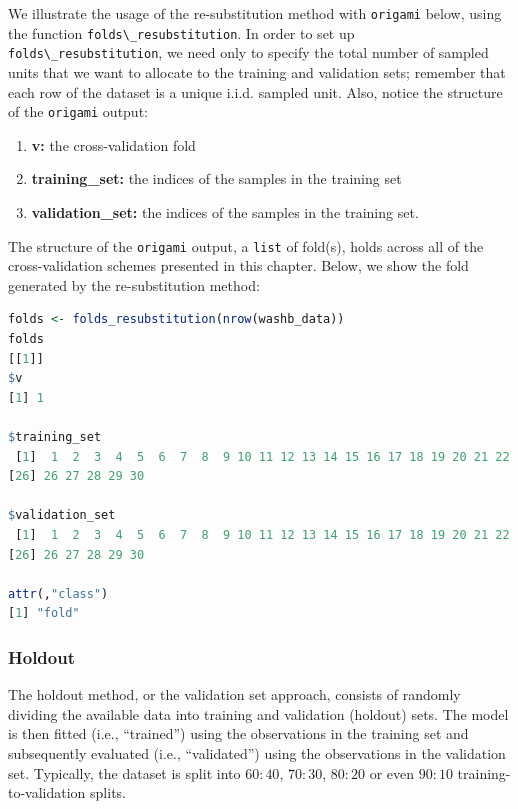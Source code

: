 \documentclass[
  12pt, krantz2,
]{krantz}
\newcommand{\passthrough}[1]{#1}
\providecommand{\tightlist}{%
  \setlength{\itemsep}{0pt}\setlength{\parskip}{0pt}}
\newcommand{\1}{\mathbbm{1}}
\theoremstyle{definition}
\theoremstyle{definition}
\theoremstyle{definition}
\theoremstyle{definition}
\theoremstyle{remark}
\begin{document}
We illustrate the usage of the re-substitution method with \passthrough{\lstinline!origami!} below,
using the function \passthrough{\lstinline!folds\_resubstitution!}. In order to set up
\passthrough{\lstinline!folds\_resubstitution!}, we need only to specify the total number of sampled
units that we want to allocate to the training and validation sets; remember
that each row of the dataset is a unique i.i.d. sampled unit. Also, notice the
structure of the \passthrough{\lstinline!origami!} output:

\begin{enumerate}
\def\labelenumi{\arabic{enumi}.}
\tightlist
\item
  \textbf{v:} the cross-validation fold
\item
  \textbf{training\_set:} the indices of the samples in the training set
\item
  \textbf{validation\_set:} the indices of the samples in the training set.
\end{enumerate}

The structure of the \passthrough{\lstinline!origami!} output, a \passthrough{\lstinline!list!} of fold(s), holds across all of
the cross-validation schemes presented in this chapter. Below, we show the fold
generated by the re-substitution method:

\begin{lstlisting}[language=R]
folds <- folds_resubstitution(nrow(washb_data))
folds
[[1]]
$v
[1] 1

$training_set
 [1]  1  2  3  4  5  6  7  8  9 10 11 12 13 14 15 16 17 18 19 20 21 22 23 24 25
[26] 26 27 28 29 30

$validation_set
 [1]  1  2  3  4  5  6  7  8  9 10 11 12 13 14 15 16 17 18 19 20 21 22 23 24 25
[26] 26 27 28 29 30

attr(,"class")
[1] "fold"
\end{lstlisting}

\hypertarget{holdout}{%
\subsubsection{Holdout}\label{holdout}}

The holdout method, or the validation set approach, consists of randomly
dividing the available data into training and validation (holdout) sets. The
model is then fitted (i.e., ``trained'') using the observations in the training
set and subsequently evaluated (i.e., ``validated'') using the observations in the
validation set. Typically, the dataset is split into \(60:40\), \(70:30\), \(80:20\)
or even \(90:10\) training-to-validation splits.
\end{document}
